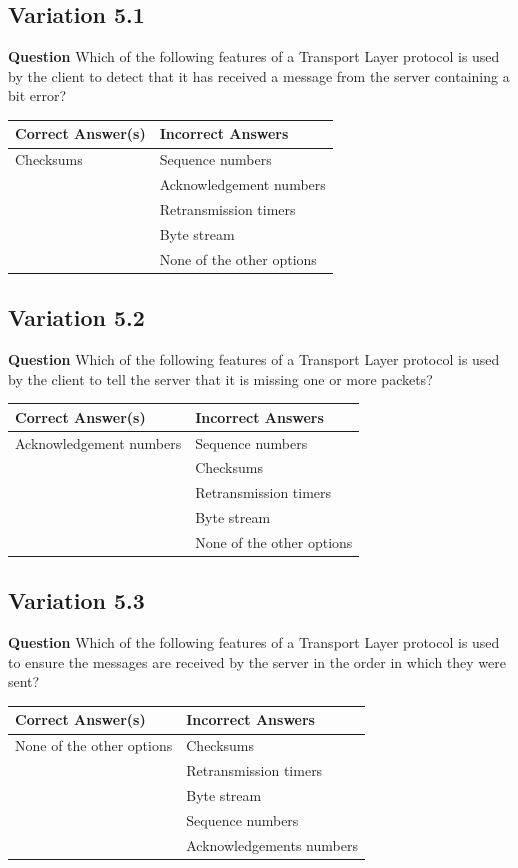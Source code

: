 \subsection{Variation 5.1}
\textbf{Question} Which of the following features of a Transport Layer protocol is used by the client to detect that it has received a message from the server containing a bit error? \\
\begin{tabular}{|l|l|}
    \hline
    \textbf{Correct Answer(s)} & \textbf{Incorrect Answers} \\
    \hline
    Checksums & Sequence numbers \\
        & Acknowledgement numbers \\
        & Retransmission timers \\
        & Byte stream \\
        & None of the other options \\
    \hline
\end{tabular}
\subsection{Variation 5.2}
\textbf{Question} Which of the following features of a Transport Layer protocol is used by the client to tell the server that it is missing one or more packets? \\
\begin{tabular}{|l|l|}
    \hline
    \textbf{Correct Answer(s)} & \textbf{Incorrect Answers} \\
    \hline
    Acknowledgement numbers & Sequence numbers \\
        & Checksums \\
        & Retransmission timers \\
        & Byte stream \\
        & None of the other options \\
    \hline
\end{tabular}
\subsection{Variation 5.3}
\textbf{Question} Which of the following features of a Transport Layer protocol is used to ensure the messages are received by the server in the order in which they were sent? \\
\begin{tabular}{|l|l|}
    \hline
    \textbf{Correct Answer(s)} & \textbf{Incorrect Answers} \\
    \hline
    None of the other options & Checksums \\
        & Retransmission timers \\
        & Byte stream \\
        & Sequence numbers \\
        & Acknowledgements numbers \\
    \hline
\end{tabular}

